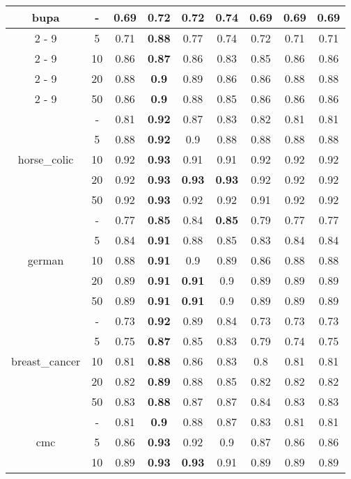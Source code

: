 \documentclass{article}%
\begin{document}
\begin{tabular}{c|c|ccccccc}
\hline%
\multirow{5}{*}{bupa}&{-}&0.69&0.72&0.72&\textbf{0.74}&0.69&0.69&0.69\\%
\cline{2%
-%
9}%
&5&0.71&\textbf{0.88}&0.77&0.74&0.72&0.71&0.71\\%
\cline{2%
-%
9}%
&10&0.86&\textbf{0.87}&0.86&0.83&0.85&0.86&0.86\\%
\cline{2%
-%
9}%
&20&0.88&\textbf{0.9}&0.89&0.86&0.86&0.88&0.88\\%
\cline{2%
-%
9}%
&50&0.86&\textbf{0.9}&0.88&0.85&0.86&0.86&0.86\\%
\hline%
\multirow{5}{*}{horse\_colic}&{-}&0.81&\textbf{0.92}&0.87&0.83&0.82&0.81&0.81\\%
\cline{2%
-%
9}%
&5&0.88&\textbf{0.92}&0.9&0.88&0.88&0.88&0.88\\%
\cline{2%
-%
9}%
&10&0.92&\textbf{0.93}&0.91&0.91&0.92&0.92&0.92\\%
\cline{2%
-%
9}%
&20&0.92&\textbf{0.93}&\textbf{0.93}&\textbf{0.93}&0.92&0.92&0.92\\%
\cline{2%
-%
9}%
&50&0.92&\textbf{0.93}&0.92&0.92&0.91&0.92&0.92\\%
\hline%
\multirow{5}{*}{german}&{-}&0.77&\textbf{0.85}&0.84&\textbf{0.85}&0.79&0.77&0.77\\%
\cline{2%
-%
9}%
&5&0.84&\textbf{0.91}&0.88&0.85&0.83&0.84&0.84\\%
\cline{2%
-%
9}%
&10&0.88&\textbf{0.91}&0.9&0.89&0.86&0.88&0.88\\%
\cline{2%
-%
9}%
&20&0.89&\textbf{0.91}&\textbf{0.91}&0.9&0.89&0.89&0.89\\%
\cline{2%
-%
9}%
&50&0.89&\textbf{0.91}&\textbf{0.91}&0.9&0.89&0.89&0.89\\%
\hline%
\multirow{5}{*}{breast\_cancer}&{-}&0.73&\textbf{0.92}&0.89&0.84&0.73&0.73&0.73\\%
\cline{2%
-%
9}%
&5&0.75&\textbf{0.87}&0.85&0.83&0.79&0.74&0.75\\%
\cline{2%
-%
9}%
&10&0.81&\textbf{0.88}&0.86&0.83&0.8&0.81&0.81\\%
\cline{2%
-%
9}%
&20&0.82&\textbf{0.89}&0.88&0.85&0.82&0.82&0.82\\%
\cline{2%
-%
9}%
&50&0.83&\textbf{0.88}&0.87&0.87&0.84&0.83&0.83\\%
\hline%
\multirow{5}{*}{cmc}&{-}&0.81&\textbf{0.9}&0.88&0.87&0.83&0.81&0.81\\%
\cline{2%
-%
9}%
&5&0.86&\textbf{0.93}&0.92&0.9&0.87&0.86&0.86\\%
\cline{2%
-%
9}%
&10&0.89&\textbf{0.93}&\textbf{0.93}&0.91&0.89&0.89&0.89\\%

\end{tabular}
\end{document}
